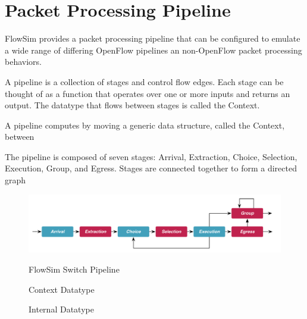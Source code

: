 \section{Packet Processing Pipeline}





FlowSim provides a packet processing pipeline that can be configured to emulate
a wide range of differing OpenFlow pipelines an non-OpenFlow packet processing
behaviors.

A pipeline is a collection of stages and control flow edges. Each stage can be
thought of as a function that operates over one or more inputs and returns an 
output. The datatype that flows between stages is called the Context.

A pipeline computes
by moving a generic data structure, called the Context, between 

The pipeline is composed of seven stages: Arrival, Extraction, Choice, 
Selection, Execution, Group, and Egress. Stages are connected together to
form a directed graph


\begin{figure}[h]
  \includegraphics[width=\linewidth]{figures/pipeline.pdf}
  \label{figure:pipeline}
  \caption{FlowSim Switch Pipeline}
\end{figure}

\begin{figure}
  
  \label{listing:context}
  \caption{Context Datatype}
\end{figure}

\begin{figure}
  
  \label{listing:internal}
  \caption{Internal Datatype}
\end{figure}

